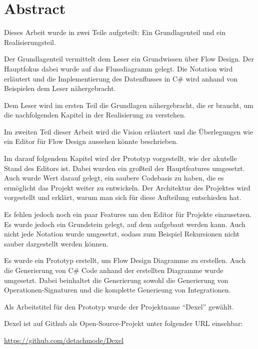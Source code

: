 
\chapter*{Abstract}

Dieses Arbeit wurde in zwei Teile aufgeteilt: 
Ein Grundlagenteil und ein Realisierungsteil.

Der Grundlagenteil vermittelt dem Leser ein Grundwissen über Flow Design.
Der Hauptfokus dabei wurde auf das Flussdiagramm gelegt.
Die Notation wird erläutert und die Implementierung des Datenflusses in C\#
wird anhand von Beispielen dem Leser nähergebracht.

Dem Leser wird im ersten Teil die Grundlagen nähergebracht, die er braucht, um die
nachfolgenden Kapitel in der Realisierung zu verstehen.

Im zweiten Teil dieser Arbeit wird die Vision erläutert und die Überlegungen wie ein
Editor für Flow Design aussehen könnte beschrieben.

Im darauf folgendem Kapitel wird der Prototyp vorgestellt, wie der akutelle Stand des
Editors ist. Dabei wurden ein großteil der Hauptfeatures umgesetzt.
Auch wurde Wert darauf gelegt, ein saubere Codebasis zu haben, die es ermöglicht 
das Projekt weiter zu entwickeln.
Der Architektur des Projektes wird vorgestellt und erklärt, warum man sich für 
diese Aufteilung entschieden hat.

Es fehlen jedoch noch ein paar Features um den Editor für Projekte einzusetzen.
Es wurde jedoch ein Grundstein gelegt, auf dem aufgebaut werden kann.
Auch nicht jede Notation wurde umgesetzt, sodass zum Beispiel Rekursionen
nicht sauber dargestellt werden können.


Es wurde ein Prototyp erstellt, um Flow Design Diagramme zu erstellen.
Auch die Generierung von C\# Code anhand der erstellten Diagramme wurde umgesetzt.
Dabei beinhaltet die Generierung sowohl die Generierung von Operationen-Signaturen und 
die komplette Generieung von Integrationen.


Als Arbeitstitel für den Prototyp wurde der Projektname \enquote{Dexel} gewählt.


Dexel ist auf Github als Open-Source-Projekt unter folgender URL einsehbar:

\url{https://github.com/detachmode/Dexel}



